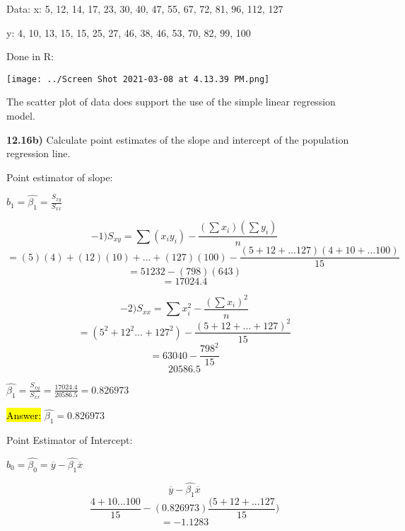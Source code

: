 \documentclass{article}
\begin{document}
Data: 
x: 5, 12, 14, 17, 23, 30, 40, 47, 55, 67, 72, 81, 96, 112, 127

\vspace{2mm}

y: 4, 10, 13, 15, 15, 25, 27, 46, 38, 46, 53, 70, 82, 99, 100

\vspace{2mm}



Done in R:

\vspace{2mm}

\texttt{[image: ../Screen Shot 2021-03-08 at 4.13.39 PM.png]}


The scatter plot of data does support the use of the simple linear regression model.

\vspace{5mm}

\textbf{12.16b)} Calculate point estimates of the slope and intercept of the population regression line.

\vspace{2mm}

Point estimator of slope:

$b_{1}=\hat{\beta_{1}}=\frac{S_{xy}}{S_{xx}}$ 

$$-1) S_{xy}=\sum (x_{i}y_{i})-\frac{(\sum x_{i})(\sum y_{i})}{n}$$
$$=(5)(4)+(12)(10)+...+(127)(100)-\frac{(5+12+...127)(4+10+...100)}{15}$$
$$=51232-(798)(643)$$
$$=17024.4$$


$$-2) S_{xx}= \sum x_{i}^{2}-\frac{(\sum x_{i})^{2}}{n}$$
$$=(5^{2}+12^{2}...+127^{2})-\frac{(5+12+...+127)^{2}}{15}$$
$$=63040-\frac{798^{2}}{15}$$
$$20586.5$$


\vspace{2mm}

$\hat{\beta_{1}}=\frac{S_{xy}}{S_{xx}}=\frac{17024.4}{20586.5}=0.826973$

\vspace{2mm}

\hl{Answer:} $\hat{\beta_{1}}=0.826973$


\vspace{4mm}

Point Estimator of Intercept:

\vspace{2mm}

$b_{0}=\hat{\beta_{0}}=\overline{y}-\hat{\beta_{1}}\overline{x}$

\vspace{2mm}

$$\overline{y}-\hat{\beta_{1}}\overline{x}$$
$$\frac{4+10...100}{15}-(0.826973)\frac{(5+12+...127}{15})$$
$$=-1.1283$$
\end{document}

